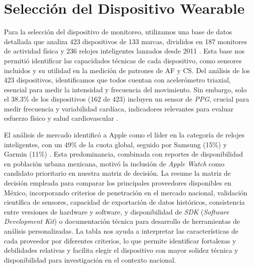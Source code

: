 \section{Selección del Dispositivo Wearable}
\label{sec:seleccion_dispositivo}

Para la selección del dispositivo de monitoreo, utilizamos una base de datos detallada que analiza 423 dispositivos de 133 marcas, divididos en 187 monitores de actividad física y 236 relojes inteligentes lanzados desde 2011 \cite{Henriksen2021ReplicationData}. Esta base nos permitió identificar las capacidades técnicas de cada dispositivo, como sensores incluidos y su utilidad en la medición de patrones de AF y CS. Del análisis de los 423 dispositivos, identificamos que todos cuentan con acelerómetro triaxial, esencial para medir la intensidad y frecuencia del movimiento. Sin embargo, solo el 38.3\% de los dispositivos (162 de 423) incluyen un sensor de \textit{PPG}, crucial para medir frecuencia y variabilidad cardíaca, indicadores relevantes para evaluar esfuerzo físico y salud cardiovascular \cite{Pinto2023Physiology}.

El análisis de mercado identificó a Apple como el líder en la categoría de relojes inteligentes, con un 49\% de la cuota global, seguido por Samsung (15\%) y Garmin (11\%) \cite{Canalys2024Wearables}. Esta predominancia, combinada con reportes de disponibilidad en población urbana mexicana, motivó la inclusión de \textit{Apple Watch} como candidato prioritario en nuestra matriz de decisión. La  resume la matriz de decisión empleada para comparar los principales proveedores disponibles en México, incorporando criterios de penetración en el mercado nacional, validación científica de sensores, capacidad de exportación de datos históricos, consistencia entre versiones de hardware y software, y disponibilidad de \textit{SDK} (\textit{Software Development Kit}) o documentación técnica para desarrollo de herramientas de análisis personalizadas. La tabla nos ayuda a interpretar las características de cada proveedor por diferentes criterios, lo que permite identificar fortalezas y debilidades relativas y facilita elegir el dispositivo con mayor solidez técnica y disponibilidad para investigación en el contexto nacional.

